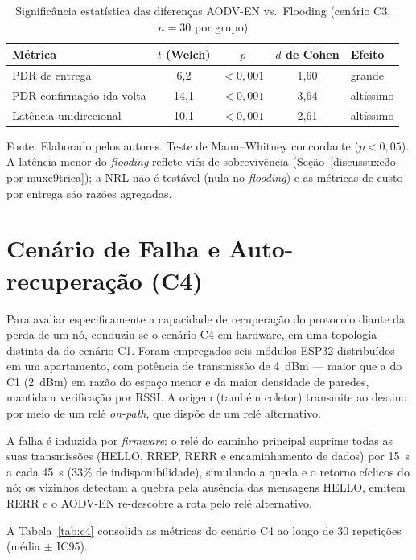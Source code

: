 \begin{table}[H]
\centering
\caption{Significância estatística das diferenças AODV-EN vs.~Flooding (cenário C3, $n=30$ por grupo)}\label{tab:c3-stats}
\begin{tabular}{@{}lcccl@{}}
\toprule
Métrica & $t$ (Welch) & $p$ & $d$ de Cohen & Efeito \\
\midrule
PDR de entrega & 6,2 & $<0{,}001$ & 1,60 & grande \\
PDR confirmação ida-volta & 14,1 & $<0{,}001$ & 3,64 & altíssimo \\
Latência unidirecional & 10,1 & $<0{,}001$ & 2,61 & altíssimo \\
\bottomrule
\end{tabular}

\vspace{2pt}
{\footnotesize Fonte: Elaborado pelos autores. Teste de Mann--Whitney concordante
($p<0{,}05$). A latência menor do \emph{flooding} reflete viés de sobrevivência
(Seção~\ref{discussuxe3o-por-muxe9trica}); a NRL não é testável (nula no \emph{flooding}) e
as métricas de custo por entrega são razões agregadas.}
\end{table}

\section{Cenário de Falha e Auto-recuperação (C4)}\label{cenario-de-falha-c4}

Para avaliar especificamente a capacidade de recuperação do protocolo diante
da perda de um nó, conduziu-se o cenário C4 em hardware, em uma topologia
distinta da do cenário C1. Foram empregados seis módulos ESP32 distribuídos
em um apartamento, com potência de transmissão de 4~dBm --- maior que a do C1
(2~dBm) em razão do espaço menor e da maior densidade de paredes, mantida a
verificação por RSSI. A origem (também coletor) transmite ao destino por meio
de um relé \emph{on-path}, que dispõe de um relé alternativo.

A falha é
induzida por \emph{firmware}: o relé do caminho principal suprime todas as suas
transmissões (HELLO, RREP, RERR e encaminhamento de dados) por 15~s a cada 45~s
(33\% de indisponibilidade), simulando a queda e o
retorno cíclicos do nó; os vizinhos detectam a quebra pela ausência das mensagens HELLO,
emitem RERR e o AODV-EN re-descobre a rota pelo relé alternativo.

A Tabela~\ref{tab:c4} consolida as métricas do cenário C4 ao longo de 30
repetições (média $\pm$ IC95).

